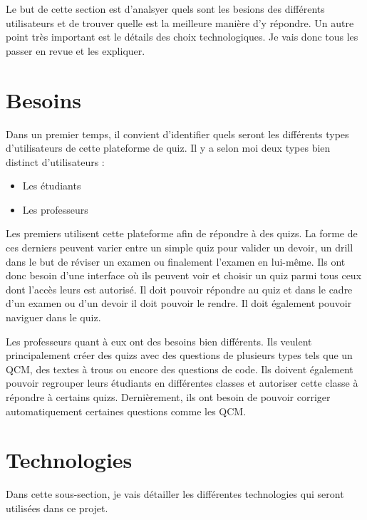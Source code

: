 Le but de cette section est d'analsyer quels sont les besions des différents utilisateurs et de trouver quelle est la meilleure manière d'y répondre. Un autre point très important est le détails des choix technologiques. Je vais donc tous les passer en revue et les expliquer.
\section{Besoins}

Dans un premier temps, il convient d'identifier quels seront les différents types d'utilisateurs de cette plateforme de quiz. Il y a selon moi deux types bien distinct d'utilisateurs :
\begin{itemize}
    \item Les étudiants
    \item Les professeurs
\end{itemize}

Les premiers utilisent cette plateforme afin de répondre à des quizs. La forme de ces derniers peuvent varier entre un simple quiz pour valider un devoir, un drill dans le but de réviser un examen ou finalement l'examen en lui-même. Ils ont donc besoin d'une interface où ils peuvent voir et choisir un quiz parmi tous ceux dont l'accès leurs est autorisé. Il doit pouvoir répondre au quiz et dans le cadre d'un examen ou d'un devoir il doit pouvoir le rendre. Il doit également pouvoir naviguer dans le quiz.

Les professeurs quant à eux ont des besoins bien différents. Ils veulent principalement créer des quizs avec des questions de plusieurs types tels que un QCM, des textes à trous ou encore des questions de code. Ils doivent également pouvoir regrouper leurs étudiants en différentes classes et autoriser cette classe à répondre à certains quizs. Dernièrement, ils ont besoin de pouvoir corriger automatiquement certaines questions comme les QCM.




\section{Technologies}
Dans cette sous-section, je vais détailler les différentes technologies qui seront utilisées dans ce projet.
